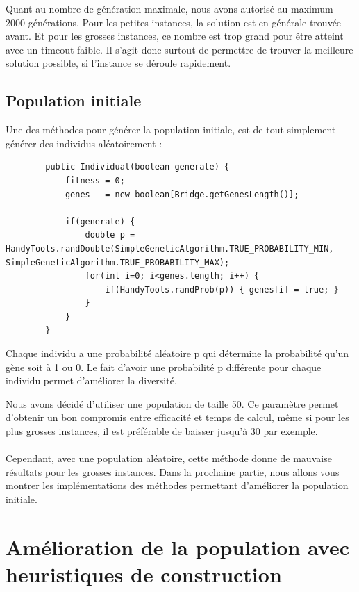 	Quant au nombre de génération maximale, nous avons autorisé au maximum 2000 générations. Pour les petites instances, la solution est en générale trouvée avant. Et pour les grosses instances, ce nombre est trop grand pour
être atteint avec un timeout faible. Il s'agit donc surtout de permettre de trouver la meilleure solution possible, si l'instance se déroule rapidement.	
	\subsection{Population initiale}

	Une des méthodes pour générer la population initiale, est de tout simplement générer des individus aléatoirement :

		\begin{lstlisting}
		public Individual(boolean generate) {
			fitness = 0;
			genes 	= new boolean[Bridge.getGenesLength()];
			
			if(generate) {
				double p =  HandyTools.randDouble(SimpleGeneticAlgorithm.TRUE_PROBABILITY_MIN, SimpleGeneticAlgorithm.TRUE_PROBABILITY_MAX);
				for(int i=0; i<genes.length; i++) {
					if(HandyTools.randProb(p)) { genes[i] = true; }
				}
			}
		}
		\end{lstlisting}

	Chaque individu a une probabilité aléatoire p qui détermine la probabilité qu'un gène soit à 1 ou 0. Le fait d'avoir une probabilité p
différente pour chaque individu permet d'améliorer la diversité.

	Nous avons décidé d'utiliser une population de taille 50. Ce paramètre permet d'obtenir un bon compromis entre efficacité et temps de calcul, même si
pour les plus grosses instances, il est préférable de baisser jusqu'à 30 par exemple.

	\paragraph{}Cependant, avec une population aléatoire, cette méthode donne de mauvaise résultats pour les grosses instances. Dans la prochaine partie, nous allons vous montrer les implémentations
des méthodes permettant d'améliorer la population initiale.
    
\newpage
\section{Amélioration de la population avec heuristiques de construction}

